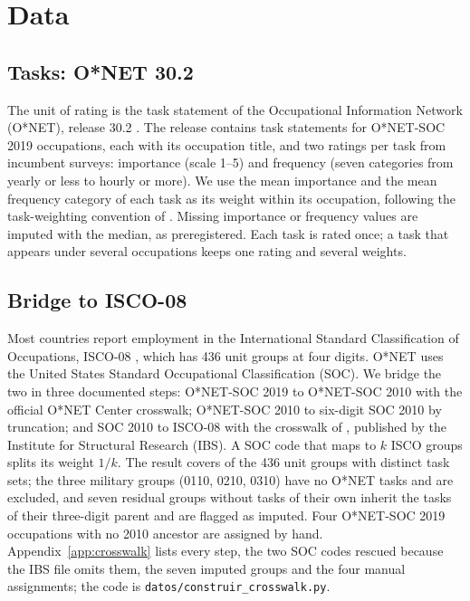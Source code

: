 \section{Data}
\label{sec:datos}

\subsection{Tasks: O*NET 30.2}

The unit of rating is the task statement of the Occupational Information Network (O*NET), release 30.2 \citep{onet2026database}.
The release contains  task statements for  O*NET-SOC 2019 occupations, each with its occupation title, and two ratings per task from incumbent surveys: importance (scale 1--5) and frequency (seven categories from yearly or less to hourly or more).
We use the mean importance and the mean frequency category of each task as its weight within its occupation, following the task-weighting convention of \citet{acemoglu2011skills}.
Missing importance or frequency values are imputed with the median, as preregistered.
Each task is rated once; a task that appears under several occupations keeps one rating and several weights.

\subsection{Bridge to ISCO-08}

Most countries report employment in the International Standard Classification of Occupations, ISCO-08 \citep{ilo2012isco}, which has 436 unit groups at four digits.
O*NET uses the United States Standard Occupational Classification (SOC).
We bridge the two in three documented steps: O*NET-SOC 2019 to O*NET-SOC 2010 with the official O*NET Center crosswalk; O*NET-SOC 2010 to six-digit SOC 2010 by truncation; and SOC 2010 to ISCO-08 with the crosswalk of \citet{hardy2018educational}, published by the Institute for Structural Research (IBS).
A SOC code that maps to $k$ ISCO groups splits its weight $1/k$.
The result covers  of the 436 unit groups with  distinct task sets; the three military groups (0110, 0210, 0310) have no O*NET tasks and are excluded, and seven residual groups without tasks of their own inherit the tasks of their three-digit parent and are flagged as imputed.
Four O*NET-SOC 2019 occupations with no 2010 ancestor are assigned by hand.
Appendix~\ref{app:crosswalk} lists every step, the two SOC codes rescued because the IBS file omits them, the seven imputed groups and the four manual assignments; the code is \texttt{datos/construir\_crosswalk.py}.

